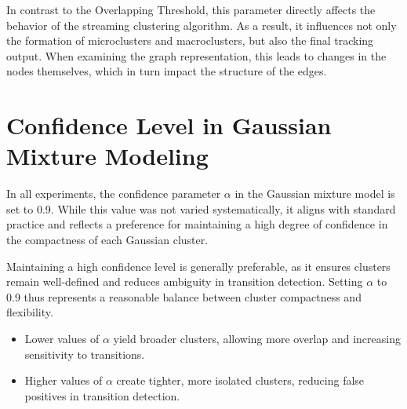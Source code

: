 In contrast to the Overlapping Threshold, this parameter directly affects the
behavior of the streaming clustering algorithm. As a result, it influences not
only the formation of microclusters and macroclusters, but also the final
tracking output. When examining the graph representation, this leads to changes
in the nodes themselves, which in turn impact the structure of the edges.

\section{Confidence Level in Gaussian Mixture Modeling}
In all experiments, the confidence parameter \(\alpha\) in the Gaussian mixture
model is set to 0.9. While this value was not varied systematically, it aligns
with standard practice and reflects a preference for maintaining a high degree
of confidence in the compactness of each Gaussian cluster.

Maintaining a high confidence level is generally preferable, as it ensures
clusters remain well-defined and reduces ambiguity in transition detection.
Setting $\alpha$ to 0.9 thus represents a reasonable balance between cluster
compactness and flexibility.

\begin{itemize}
      \item Lower values of $\alpha$ yield broader clusters, allowing more overlap and
            increasing sensitivity to transitions.
      \item Higher values of $\alpha$ create tighter, more isolated clusters, reducing
            false positives in transition detection.
\end{itemize}
